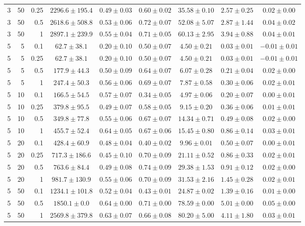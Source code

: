 \begin{table}[htbp]
\begin{tabular}{@{}rrrcccccc@{}}
3 & 50 & 0.25 & $2296.6 \pm 195.4$ & $0.49 \pm 0.03$ & $0.60 \pm 0.02$ & $35.58 \pm 0.10$ & $2.57 \pm 0.25$ & $0.02 \pm 0.00$ \\
3 & 50 & 0.5 & $2618.6 \pm 508.8$ & $0.53 \pm 0.06$ & $0.72 \pm 0.07$ & $52.08 \pm 5.07$ & $2.87 \pm 1.44$ & $0.04 \pm 0.02$ \\
3 & 50 & 1 & $2897.1 \pm 239.9$ & $0.55 \pm 0.04$ & $0.71 \pm 0.05$ & $60.13 \pm 2.95$ & $3.94 \pm 0.88$ & $0.04 \pm 0.01$ \\
\midrule
5 & 5 & 0.1 & $62.7 \pm 38.1$ & $0.20 \pm 0.10$ & $0.50 \pm 0.07$ & $4.50 \pm 0.21$ & $0.03 \pm 0.01$ & $-0.01 \pm 0.01$ \\
5 & 5 & 0.25 & $62.7 \pm 38.1$ & $0.20 \pm 0.10$ & $0.50 \pm 0.07$ & $4.50 \pm 0.21$ & $0.03 \pm 0.01$ & $-0.01 \pm 0.01$ \\
5 & 5 & 0.5 & $177.9 \pm 44.3$ & $0.50 \pm 0.09$ & $0.64 \pm 0.07$ & $6.07 \pm 0.28$ & $0.21 \pm 0.04$ & $0.02 \pm 0.00$ \\
5 & 5 & 1 & $247.4 \pm 50.3$ & $0.56 \pm 0.06$ & $0.69 \pm 0.07$ & $7.87 \pm 0.58$ & $0.30 \pm 0.06$ & $0.02 \pm 0.01$ \\
5 & 10 & 0.1 & $166.5 \pm 54.5$ & $0.57 \pm 0.07$ & $0.34 \pm 0.05$ & $4.97 \pm 0.06$ & $0.20 \pm 0.07$ & $0.00 \pm 0.01$ \\
5 & 10 & 0.25 & $379.8 \pm 95.5$ & $0.49 \pm 0.07$ & $0.58 \pm 0.05$ & $9.15 \pm 0.20$ & $0.36 \pm 0.06$ & $0.01 \pm 0.01$ \\
5 & 10 & 0.5 & $349.8 \pm 77.8$ & $0.55 \pm 0.06$ & $0.67 \pm 0.07$ & $14.34 \pm 0.71$ & $0.49 \pm 0.08$ & $0.02 \pm 0.00$ \\
5 & 10 & 1 & $455.7 \pm 52.4$ & $0.64 \pm 0.05$ & $0.67 \pm 0.06$ & $15.45 \pm 0.80$ & $0.86 \pm 0.14$ & $0.03 \pm 0.01$ \\
5 & 20 & 0.1 & $428.4 \pm 60.9$ & $0.48 \pm 0.04$ & $0.40 \pm 0.02$ & $9.96 \pm 0.01$ & $0.50 \pm 0.07$ & $0.00 \pm 0.01$ \\
5 & 20 & 0.25 & $717.3 \pm 186.6$ & $0.45 \pm 0.10$ & $0.70 \pm 0.09$ & $21.11 \pm 0.52$ & $0.86 \pm 0.33$ & $0.02 \pm 0.01$ \\
5 & 20 & 0.5 & $763.6 \pm 84.4$ & $0.49 \pm 0.08$ & $0.74 \pm 0.09$ & $29.38 \pm 1.53$ & $0.91 \pm 0.12$ & $0.02 \pm 0.00$ \\
5 & 20 & 1 & $981.7 \pm 130.9$ & $0.55 \pm 0.06$ & $0.70 \pm 0.09$ & $31.53 \pm 2.16$ & $1.45 \pm 0.28$ & $0.02 \pm 0.01$ \\
5 & 50 & 0.1 & $1234.1 \pm 101.8$ & $0.52 \pm 0.04$ & $0.43 \pm 0.01$ & $24.87 \pm 0.02$ & $1.39 \pm 0.16$ & $0.01 \pm 0.00$ \\
5 & 50 & 0.5 & $1850.1 \pm 0.0$ & $0.64 \pm 0.00$ & $0.71 \pm 0.00$ & $78.59 \pm 0.00$ & $5.01 \pm 0.00$ & $0.05 \pm 0.00$ \\
5 & 50 & 1 & $2569.8 \pm 379.8$ & $0.63 \pm 0.07$ & $0.66 \pm 0.08$ & $80.20 \pm 5.00$ & $4.11 \pm 1.80$ & $0.03 \pm 0.01$ \\
\bottomrule
\end{tabular}
\end{table}
